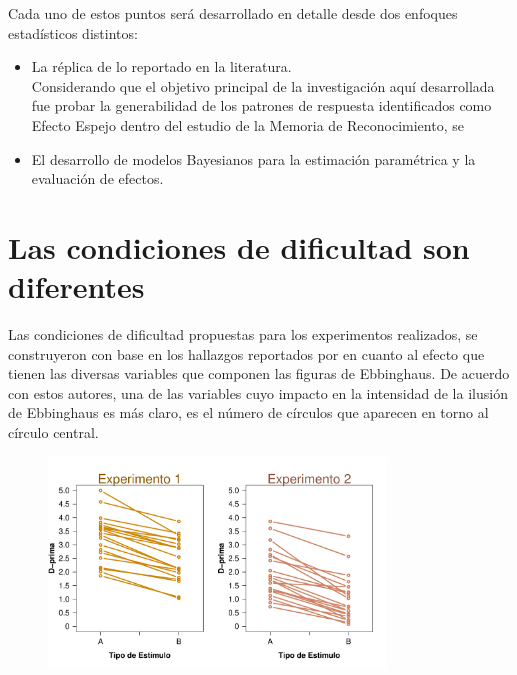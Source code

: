 Cada uno de estos puntos será desarrollado en detalle desde dos enfoques estadísticos distintos:\\

\begin{itemize}
\item La réplica de lo reportado en la literatura.\\

Considerando que el objetivo principal de la investigación aquí desarrollada fue probar la generabilidad de los patrones de respuesta identificados como Efecto Espejo dentro del estudio de la Memoria de Reconocimiento, se

\item El desarrollo de modelos Bayesianos para la estimación paramétrica y la evaluación de efectos.\\



\end{itemize}

\section{Las condiciones de dificultad son diferentes}

Las condiciones de dificultad propuestas para los experimentos realizados, se construyeron con base en los hallazgos reportados por \parencite{Masaro1971} en cuanto al efecto que tienen las diversas variables que componen las figuras de Ebbinghaus. De acuerdo con estos autores, una de las variables cuyo impacto en la intensidad de la ilusión de Ebbinghaus es más claro, es el número de círculos que aparecen en torno al círculo central.



\begin{figure}[th]
\centering
\includegraphics[width=0.80\textwidth]{Figures/Diff_D_E1yE2}
\caption[Diferencias en Discriminabilidad (Comprobando diferencias entre condiciones)]{ }
\label{fig:Diff_D}
\end{figure}

